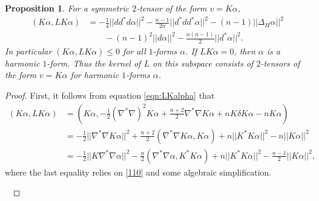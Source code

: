\documentclass[10pt,reqno]{amsart}
\newtheorem{prop}[theorem]{Proposition}
\begin{document}
\begin{prop} \label{prop:spec-est-imK}
For a symmetric $2$-tensor of the form $v = K \alpha$, 
\begin{align} \label{eqn:spec-est-imK}
(K\alpha, LK\alpha) & = -\frac14 ||dd^*d\alpha||^2 - \frac{n-1}{2n} ||d^* d d^*\alpha||^2 - (n-1) ||\Delta_H \alpha||^2 \nonumber \\
& \qquad - (n-1)^2 ||d\alpha||^2 - \frac{n(n-1)}{2} ||d^*\alpha||^2. 
\end{align}
In particular $ (K \alpha, L K \alpha) \leq 0$ for all $1$-forms $\alpha$.  If $L K \alpha = 0$, then $\alpha$ is a harmonic $1$-form.  Thus the kernel of $L$ on this subspace consists of $2$-tensors of the form $v = K \alpha$ for harmonic $1$-forms $\alpha$.
\end{prop}
\begin{proof}
First, it follows from equation \eqref{eqn:LKalpha} that
\begin{align}
 (K \alpha, L K\alpha) &= (K\alpha, -\frac{1}{2} (\nabla^* \nabla)^2 K\alpha + \frac{n+2}{2} \nabla^*\nabla K\alpha + n K \delta K\alpha -  n K\alpha) \nonumber \\
& = -\frac12 ||\nabla^*\nabla K\alpha||^2  + \frac{n+2}{2} (\nabla^*\nabla K\alpha, K\alpha) + n ||K^* K\alpha||^2 - n ||K\alpha||^2 \\ 
& = -\frac12 ||K \nabla^*\nabla \alpha||^2 - \frac{n}{2} ( \nabla^* \nabla \alpha, K^* K\alpha) + n ||K^* K\alpha||^2 - \frac{n-1}{2} ||K\alpha||^2,
\label{112} 
\end{align}
where the last equality relies on \eqref{110} and some algebraic simplification. 

\ 


\end{proof}
\end{document}
